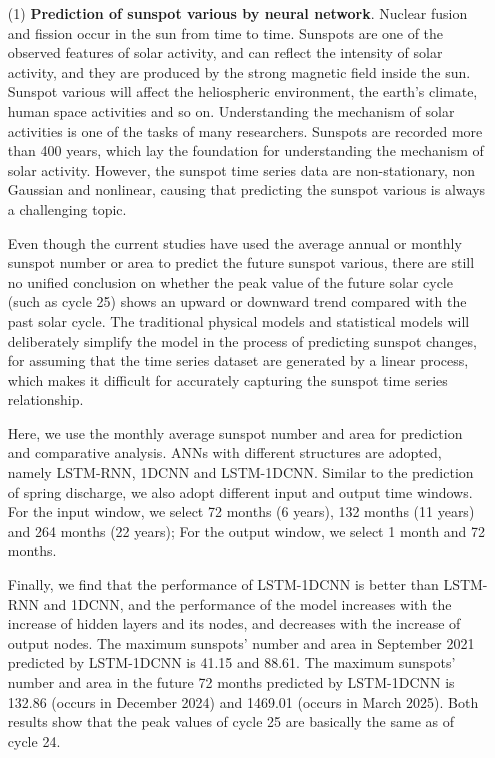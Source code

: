 \begin{enumerate}

  \item[(1)] \textbf{Prediction of sunspot various by neural network}. Nuclear fusion and fission occur in the sun from time to time. Sunspots are one of the observed features of solar activity, and can reflect the intensity of solar activity, and they are produced by the strong magnetic field inside the sun. Sunspot various will affect the heliospheric environment, the earth's climate, human space activities and so on. Understanding the mechanism of solar activities is one of the tasks of many researchers. Sunspots are recorded more than 400 years, which lay the foundation for understanding the mechanism of solar activity. However, the sunspot time series data are non-stationary, non Gaussian and nonlinear, causing that predicting the sunspot various is always a challenging topic.
 
  Even though the current studies have used the average annual or monthly sunspot number or area to predict the future sunspot various, there are still no unified conclusion on whether the peak value of the future solar cycle (such as cycle 25) shows an upward or downward trend compared with the past solar cycle. The traditional physical models and statistical models will deliberately simplify the model in the process of predicting sunspot changes, for assuming that the time series dataset are generated by a linear process, which makes it difficult for accurately capturing the sunspot time series relationship.

  Here, we use the monthly average sunspot number and area for prediction and comparative analysis. ANNs with different structures are adopted, namely LSTM-RNN, 1DCNN and LSTM-1DCNN. Similar to the prediction of spring discharge, we also adopt different input and output time windows. For the input window, we select 72 months (6 years), 132 months (11 years) and 264 months (22 years);  For the output window, we select 1 month and 72 months.

  Finally, we find that the performance of LSTM-1DCNN is better than LSTM-RNN and 1DCNN, and the performance of the model increases with the increase of hidden layers and its nodes, and decreases with the increase of output nodes. The maximum sunspots' number and area in September 2021 predicted by LSTM-1DCNN is 41.15 and 88.61. The maximum sunspots' number and area in the future 72 months predicted by LSTM-1DCNN is 132.86 (occurs in December 2024) and 1469.01 (occurs in March 2025). Both results show that the peak values of cycle 25 are basically the same as of cycle 24. 


\end{enumerate}
